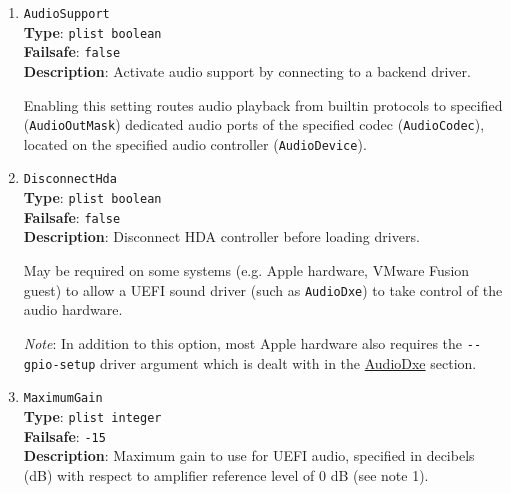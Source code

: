 \documentclass[]{article}
\begin{document}
\begin{enumerate}
  Further information on the available output channels may be found from a Linux codec dump using the command:

  \texttt{cat /proc/asound/card\{n\}/codec\#\{m\}}

  Using \texttt{AudioOutMask}, it is possible to play sound to more than one channel (e.g. main speaker plus bass speaker;
  headphones plus speakers) as long as all the chosen outputs support the sound file format in use; if any do not then no
  sound will play and a warning will be logged.

  When all available output channels on the codec support the available sound file format then a value
  of \texttt{-1} will play sound to all channels simultaneously. If this does not work it will usually be quickest
  to try each available output channel one by one, by setting \texttt{AudioOutMask} to \texttt{1}, \texttt{2},
  \texttt{4}, etc., up to 2 \texttt{\^{}} \texttt{N - 1}, in order to work out which channel(s) produce sound.

\item
  \texttt{AudioSupport}\\
  \textbf{Type}: \texttt{plist\ boolean}\\
  \textbf{Failsafe}: \texttt{false}\\
  \textbf{Description}: Activate audio support by connecting to a backend driver.

  Enabling this setting routes audio playback from builtin protocols to specified
  (\texttt{AudioOutMask}) dedicated audio ports of the specified codec (\texttt{AudioCodec}),
  located on the specified audio controller (\texttt{AudioDevice}).

\item
  \texttt{DisconnectHda}\\
  \textbf{Type}: \texttt{plist\ boolean}\\
  \textbf{Failsafe}: \texttt{false}\\
  \textbf{Description}: Disconnect HDA controller before loading drivers.

  May be required on some systems (e.g. Apple hardware, VMware Fusion guest) to allow
  a UEFI sound driver (such as \texttt{AudioDxe}) to take control of the audio hardware.

  \emph{Note}: In addition to this option, most Apple hardware also requires the
  \texttt{-{}-gpio-setup} driver argument which is dealt with in the
  \hyperref[uefiaudio]{AudioDxe} section.

\item
  \texttt{MaximumGain}\\
  \textbf{Type}: \texttt{plist\ integer}\\
  \textbf{Failsafe}: \texttt{-15}\\
  \textbf{Description}: Maximum gain to use for UEFI audio, specified in decibels (dB) with respect to amplifier
  reference level of 0 dB (see note 1).


\end{enumerate}
\end{document}

